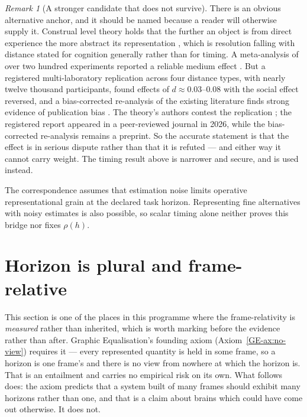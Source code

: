 \documentclass[11pt,a4paper]{article}
\theoremstyle{remark}
\newtheorem{remark}{Remark}[section]
\begin{document}
\begin{remark}[A stronger candidate that does not survive]\label{rem:clt}
There is an obvious alternative anchor, and it should be named because a reader will otherwise
supply it. Construal level theory holds that the further an object is from direct experience the
more abstract its representation \citep{tropeliberman2010}, which is resolution falling with
distance stated for cognition generally rather than for timing. A meta-analysis of over two hundred
experiments reported a reliable medium effect \citep{soderberg2015}. But a registered multi-laboratory
replication across four distance types, with nearly twelve thousand participants, found effects of
$d\approx0.03$--$0.08$ with the social effect reversed, and a bias-corrected re-analysis of the
existing literature finds strong evidence of publication bias \citep{calderon2026,maier2022}. The
theory's authors contest the replication \citep{liberman2026}; the registered report appeared in
a peer-reviewed journal in 2026, while the bias-corrected re-analysis remains a preprint. So the
accurate statement is that the effect is in serious dispute rather than that it is refuted --- and
either way it cannot carry weight. The timing result above is narrower and secure,
and is used instead.
\end{remark}

The correspondence assumes that estimation noise limits operative
representational grain at the declared task horizon. Representing fine
alternatives with noisy estimates is also possible, so scalar timing alone
neither proves this bridge nor fixes $\rho(h)$.

\section{Horizon is plural and frame-relative}\label{sec:horizon}
This section is one of the places in this programme where the frame-relativity is \emph{measured}
rather than inherited, which is worth marking before the evidence rather than after. Graphic Equalisation's
founding axiom (Axiom~\ref{GE-ax:no-view}) requires it --- every represented quantity is held in
some frame, so a horizon is one frame's and there is no view from nowhere at which the horizon is. That is an entailment and carries
no empirical risk on its own. What follows does: the axiom predicts that a system built of many frames
should exhibit many horizons rather than one, and that is a claim about brains which could have come
out otherwise. It does not.
\end{document}
